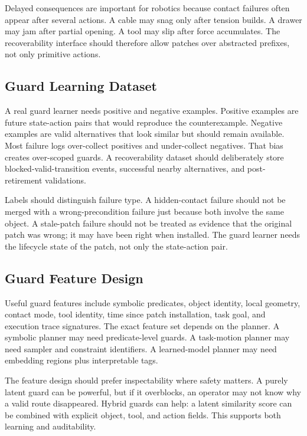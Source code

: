 \documentclass{article}
\begin{document}
Delayed consequences are important for robotics because contact failures often
appear after several actions. A cable may snag only after tension builds. A
drawer may jam after partial opening. A tool may slip after force accumulates.
The recoverability interface should therefore allow patches over abstracted
prefixes, not only primitive actions.

\subsection{Guard Learning Dataset}

A real guard learner needs positive and negative examples. Positive examples
are future state-action pairs that would reproduce the counterexample. Negative
examples are valid alternatives that look similar but should remain available.
Most failure logs over-collect positives and under-collect negatives. That bias
creates over-scoped guards. A recoverability dataset should deliberately store
blocked-valid-transition events, successful nearby alternatives, and post-
retirement validations.

Labels should distinguish failure type. A hidden-contact failure should not be
merged with a wrong-precondition failure just because both involve the same
object. A stale-patch failure should not be treated as evidence that the
original patch was wrong; it may have been right when installed. The guard
learner needs the lifecycle state of the patch, not only the state-action pair.

\subsection{Guard Feature Design}

Useful guard features include symbolic predicates, object identity, local
geometry, contact mode, tool identity, time since patch installation, task goal,
and execution trace signatures. The exact feature set depends on the planner.
A symbolic planner may need predicate-level guards. A task-motion planner may
need sampler and constraint identifiers. A learned-model planner may need
embedding regions plus interpretable tags.

The feature design should prefer inspectability where safety matters. A purely
latent guard can be powerful, but if it overblocks, an operator may not know why
a valid route disappeared. Hybrid guards can help: a latent similarity score can
be combined with explicit object, tool, and action fields. This supports both
learning and auditability.
\end{document}
